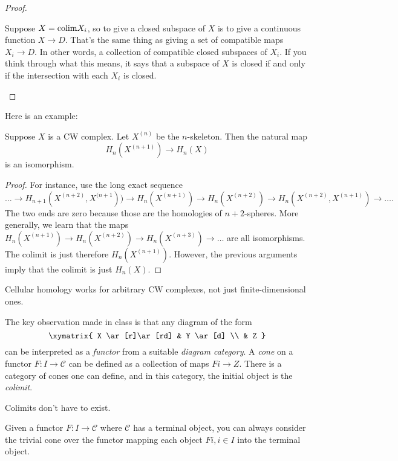 \begin{proof}
\begin{remark}
Suppose $X = \mathrm{colim} X_i$, so to give a closed subspace of $X$ is to
give a continuous function $X \to D$. That's the same thing as giving a set of
compatible maps $X_i \to D$. In other words, a collection of compatible closed
subspaces of $X_i$.  If you think through what this means, it says that a
subspace of $X$ is closed if and only if the intersection with each $X_i$ is
closed. 
\end{remark} 



\end{proof} 

Here is an example:


\begin{proposition} 
Suppose $X$ is a CW complex. Let $X^{(n)}$ be the $n$-skeleton. Then the
natural map
\[ H_n(X^{(n+1)})  \to H_n(X) \]
is an isomorphism.
\end{proposition} 
\begin{proof} 
For instance, use the long exact sequence
\[\dots \to H_{n+1}(X^{(n+2)}, X^{(n+1})) \to H_n(X^{(n+1)}) \to H_n(X^{(n+2)}) \to
H_n(X^{(n+2)}, X^{(n+1)}) \to \dots. \]
The two ends are zero because those are the homologies of $n+2$-spheres. More
generally, we learn that the maps $H_n(X^{(n+1)}) \to H_n(X^{(n+2)}) \to
H_n(X^{(n+3)}) \to \dots$ are all isomorphisms. The colimit is just therefore
$H_n(X^{(n+1)})$. However, the previous arguments imply that the colimit is
just $H_n(X)$. 
\end{proof} 

\begin{corollary} 
Cellular homology works for arbitrary CW complexes, not just finite-dimensional
ones. 
\end{corollary} 


The key observation made in class is that any diagram of the form
\[ 
\xymatrix{
X \ar[r]\ar[rd] &  Y \ar[d]  \\ 
& Z
}
\]
can be interpreted as a \emph{functor} from a suitable \emph{diagram category}. 
A \emph{cone} on a functor $F: I \to \mathcal{C}$ can be defined as a
collection of maps $Fi \to Z$.  There is a category of cones one can define,
and in this category, the initial object is the \emph{colimit}.  

Colimits don't have to exist.  

\begin{remark} 
Given a functor $F: I \to \mathcal{C}$ where $\mathcal{C}$ has a terminal
object, you can always consider the trivial cone over the functor mapping each
object  $Fi, i \in I$ into the terminal object. 
\end{remark} 

